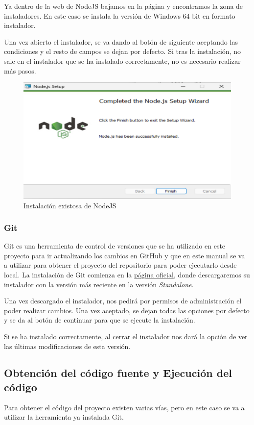 Ya dentro de la web de NodeJS bajamos en la página y encontramos la zona de instaladores. En este caso se instala la versión de Windows 64 bit en formato instalador.

Una vez abierto el instalador, se va dando al botón de siguiente aceptando las condiciones y el resto de campos se dejan por defecto.
Si tras la instalación, no sale en el instalador que se ha instalado correctamente, no es necesario realizar más pasos.

\begin{figure}[h]
    \centering
    \includegraphics[width=0.75\linewidth]{Imagenes/InstaladorNode.png}
    \caption{Instalación existosa de NodeJS}
    \label{Instalación existosa de NodeJS}
\end{figure}
\FloatBarrier

\subsubsection{Git}
Git es una herramienta de control de versiones que se ha utilizado en este proyecto para ir actualizando los cambios en GitHub y que en este manual se va a utilizar para obtener el proyecto del repositorio para poder ejecutarlo desde local.
La instalación de Git comienza en la \href{https://www.git-scm.com/downloads}{página oficial}, donde descargaremos su instalador con la versión más reciente en la versión \textit{Standalone}.

Una vez descargado el instalador, nos pedirá por permisos de administración el poder realizar cambios. Una vez aceptado, se dejan todas las opciones por defecto y se da al botón de continuar para que se ejecute la instalación.

Si se ha instalado correctamente, al cerrar el instalador nos dará la opción de ver las últimas modificaciones de esta versión.


\subsection{Obtención del código fuente y Ejecución del código}
Para obtener el código del proyecto existen varias vías, pero en este caso se va a utilizar la herramienta ya instalada Git.

